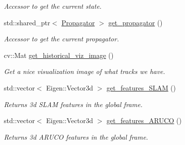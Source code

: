 \begin{DoxyCompactItemize}
\begin{DoxyCompactList}\small\item\em Accessor to get the current state. \end{DoxyCompactList}\item 
\mbox{\label{classov__msckf_1_1VioManager_a8b1118aec3492d8d4c4291e00c084e84}} 
std\+::shared\+\_\+ptr$<$ \hyperlink{classov__msckf_1_1Propagator}{Propagator} $>$ \hyperlink{classov__msckf_1_1VioManager_a8b1118aec3492d8d4c4291e00c084e84}{get\+\_\+propagator} ()
\begin{DoxyCompactList}\small\item\em Accessor to get the current propagator. \end{DoxyCompactList}\item 
\mbox{\label{classov__msckf_1_1VioManager_a52b2da9f2acc6df2b88cf8bf7cacfc32}} 
cv\+::\+Mat \hyperlink{classov__msckf_1_1VioManager_a52b2da9f2acc6df2b88cf8bf7cacfc32}{get\+\_\+historical\+\_\+viz\+\_\+image} ()
\begin{DoxyCompactList}\small\item\em Get a nice visualization image of what tracks we have. \end{DoxyCompactList}\item 
\mbox{\label{classov__msckf_1_1VioManager_a32f00c78c24062b4de0b58bcc1bcfe70}} 
std\+::vector$<$ Eigen\+::\+Vector3d $>$ \hyperlink{classov__msckf_1_1VioManager_a32f00c78c24062b4de0b58bcc1bcfe70}{get\+\_\+features\+\_\+\+S\+L\+AM} ()
\begin{DoxyCompactList}\small\item\em Returns 3d S\+L\+AM features in the global frame. \end{DoxyCompactList}\item 
\mbox{\label{classov__msckf_1_1VioManager_ae28e92d6c8c6747108aaebb971d8b4fd}} 
std\+::vector$<$ Eigen\+::\+Vector3d $>$ \hyperlink{classov__msckf_1_1VioManager_ae28e92d6c8c6747108aaebb971d8b4fd}{get\+\_\+features\+\_\+\+A\+R\+U\+CO} ()
\begin{DoxyCompactList}\small\item\em Returns 3d A\+R\+U\+CO features in the global frame. \end{DoxyCompactList}\item 

\end{DoxyCompactItemize}
